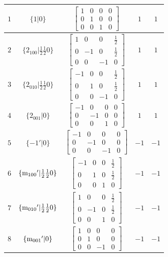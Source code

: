 \documentclass[fleqn,8pt]{jsarticle}
\begin{document}
\begin{longtable}{ccccc}
$ 1 $ & $ \{1|0\} $ & $ \begin{bmatrix} 1 & 0 & 0 & 0 \\ 0 & 1 & 0 & 0 \\ 0 & 0 & 1 & 0 \end{bmatrix} $ & $ 1 $ & $ 1 $ \\ \hline
$ 2 $ & $ \{2{}_{100}|\frac{1}{2} \frac{1}{2} 0\} $ & $ \begin{bmatrix} 1 & 0 & 0 & \frac{1}{2} \\ 0 & -1 & 0 & \frac{1}{2} \\ 0 & 0 & -1 & 0 \end{bmatrix} $ & $ 1 $ & $ 1 $ \\ \hline
$ 3 $ & $ \{2{}_{010}|\frac{1}{2} \frac{1}{2} 0\} $ & $ \begin{bmatrix} -1 & 0 & 0 & \frac{1}{2} \\ 0 & 1 & 0 & \frac{1}{2} \\ 0 & 0 & -1 & 0 \end{bmatrix} $ & $ 1 $ & $ 1 $ \\ \hline
$ 4 $ & $ \{2{}_{001}|0\} $ & $ \begin{bmatrix} -1 & 0 & 0 & 0 \\ 0 & -1 & 0 & 0 \\ 0 & 0 & 1 & 0 \end{bmatrix} $ & $ 1 $ & $ 1 $ \\ \hline
$ 5 $ & $ \{-1{}'|0\} $ & $ \begin{bmatrix} -1 & 0 & 0 & 0 \\ 0 & -1 & 0 & 0 \\ 0 & 0 & -1 & 0 \end{bmatrix} $ & $ -1 $ & $ -1 $ \\ \hline
$ 6 $ & $ \{{\rm m}_{100}{}'|\frac{1}{2} \frac{1}{2} 0\} $ & $ \begin{bmatrix} -1 & 0 & 0 & \frac{1}{2} \\ 0 & 1 & 0 & \frac{1}{2} \\ 0 & 0 & 1 & 0 \end{bmatrix} $ & $ -1 $ & $ -1 $ \\ \hline
$ 7 $ & $ \{{\rm m}_{010}{}'|\frac{1}{2} \frac{1}{2} 0\} $ & $ \begin{bmatrix} 1 & 0 & 0 & \frac{1}{2} \\ 0 & -1 & 0 & \frac{1}{2} \\ 0 & 0 & 1 & 0 \end{bmatrix} $ & $ -1 $ & $ -1 $ \\ \hline
$ 8 $ & $ \{{\rm m}_{001}{}'|0\} $ & $ \begin{bmatrix} 1 & 0 & 0 & 0 \\ 0 & 1 & 0 & 0 \\ 0 & 0 & -1 & 0 \end{bmatrix} $ & $ -1 $ & $ -1 $ \\
\end{longtable}
\end{document}
